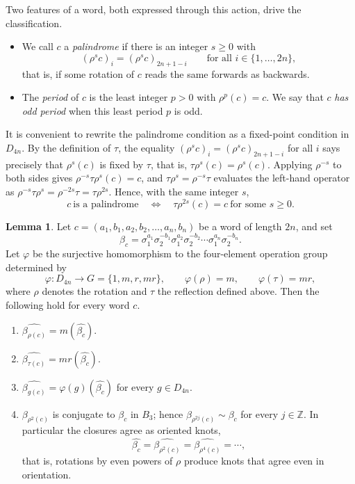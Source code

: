 \documentclass[11pt]{article}
\theoremstyle{definition}
\newtheorem{lemma}[lemma]{Lemma}
\begin{document}
\smallskip
\noindent Two features of a word, both expressed through this action, drive the
classification.
\begin{itemize}
\item We call $c$ a \emph{palindrome} if there is an integer $s\ge0$ with
\[
(\rho^{s}c)_{i}=(\rho^{s}c)_{2n+1-i}\qquad\text{for all }i\in\{1,\dots,2n\},
\]
that is, if some rotation of $c$ reads the same forwards as backwards.
\item The \emph{period} of $c$ is the least integer $p>0$ with $\rho^{p}(c)=c$.
We say that $c$ \emph{has odd period} when this least period $p$ is odd.
\end{itemize}

\noindent It is convenient to rewrite the palindrome condition as a fixed-point condition
in $D_{4n}$. By the definition of $\tau$, the equality
$(\rho^{s}c)_{i}=(\rho^{s}c)_{2n+1-i}$ for all $i$ says precisely that $\rho^{s}(c)$ is
fixed by $\tau$, that is, $\tau\rho^{s}(c)=\rho^{s}(c)$. Applying $\rho^{-s}$ to both
sides gives $\rho^{-s}\tau\rho^{s}(c)=c$, and $\tau\rho^{s}=\rho^{-s}\tau$ evaluates the
left-hand operator as $\rho^{-s}\tau\rho^{s}=\rho^{-2s}\tau=\tau\rho^{2s}$. Hence, with
the same integer $s$,
\begin{equation}\label{eq:palindrome}
c\ \text{is a palindrome}
\quad\Longleftrightarrow\quad
\tau\rho^{2s}(c)=c\ \text{for some } s\ge0 .
\end{equation}

\begin{lemma}\label{lem:dihedral}
Let $c=(a_1,b_1,a_2,b_2,\dots,a_n,b_n)$ be a word of length $2n$, and set
\[
\beta_c=\sigma_{1}^{a_1}\sigma_{2}^{-b_1}\sigma_{1}^{a_2}\sigma_{2}^{-b_2}\cdots
\sigma_{1}^{a_n}\sigma_{2}^{-b_n}.
\]
Let $\varphi$ be the surjective homomorphism to the four-element operation
group determined by
\[
\varphi\colon D_{4n}\longrightarrow G=\{1,m,r,mr\},
\qquad \varphi(\rho)=m,\qquad \varphi(\tau)=mr,
\]
where $\rho$ denotes the rotation and $\tau$ the reflection defined
above. Then the following hold for every word $c$.
\begin{enumerate}[label=\textup{(\alph*)}]
\item $\widehat{\beta_{\rho(c)}}=m(\widehat{\beta_c})$.
\item $\widehat{\beta_{\tau(c)}}=mr(\widehat{\beta_c})$.
\item $\widehat{\beta_{g(c)}}=\varphi(g)(\widehat{\beta_c})$ for every $g\in D_{4n}$.
\item $\beta_{\rho^{2}(c)}$ is conjugate to $\beta_c$ in $B_3$; hence
    $\beta_{\rho^{2j}(c)}\sim\beta_c$ for every $j\in\mathbb{Z}$. In particular the
    closures agree as oriented knots,
    \[
    \widehat{\beta_c}=\widehat{\beta_{\rho^{2}(c)}}=\widehat{\beta_{\rho^{4}(c)}}
    =\cdots ,
    \]
    that is, rotations by even powers of $\rho$ produce knots that agree even in
    orientation.
\end{enumerate}
\end{lemma}
\end{document}
